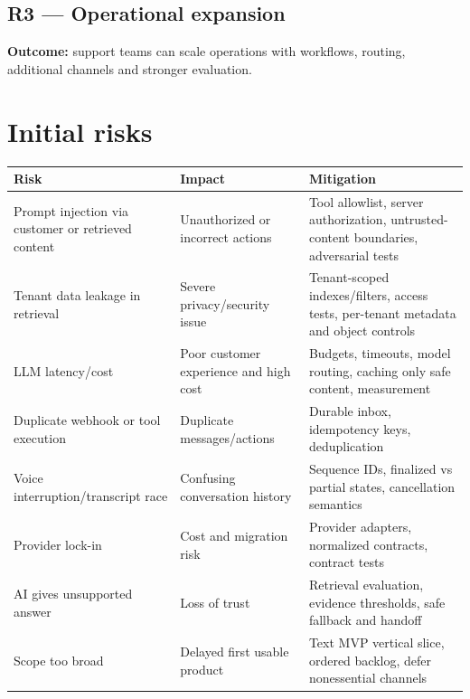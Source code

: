 \subsection{R3 --- Operational expansion}

\textbf{Outcome:} support teams can scale operations with workflows, routing, additional channels and stronger evaluation.

\section{Initial risks}

{\small
\begin{longtable}{@{}>{\raggedright\arraybackslash}p{}>{\raggedright\arraybackslash}p{}>{\raggedright\arraybackslash}p{}@{}}
\toprule
\textbf{Risk} & \textbf{Impact} & \textbf{Mitigation} \\
\midrule
\endhead
\bottomrule
\endfoot
Prompt injection via customer or retrieved content & Unauthorized or incorrect actions & Tool allowlist, server authorization, untrusted-content boundaries, adversarial tests \\
Tenant data leakage in retrieval & Severe privacy/security issue & Tenant-scoped indexes/filters, access tests, per-tenant metadata and object controls \\
LLM latency/cost & Poor customer experience and high cost & Budgets, timeouts, model routing, caching only safe content, measurement \\
Duplicate webhook or tool execution & Duplicate messages/actions & Durable inbox, idempotency keys, deduplication \\
Voice interruption/transcript race & Confusing conversation history & Sequence IDs, finalized vs partial states, cancellation semantics \\
Provider lock-in & Cost and migration risk & Provider adapters, normalized contracts, contract tests \\
AI gives unsupported answer & Loss of trust & Retrieval evaluation, evidence thresholds, safe fallback and handoff \\
Scope too broad & Delayed first usable product & Text MVP vertical slice, ordered backlog, defer nonessential channels \\
\end{longtable}
}



